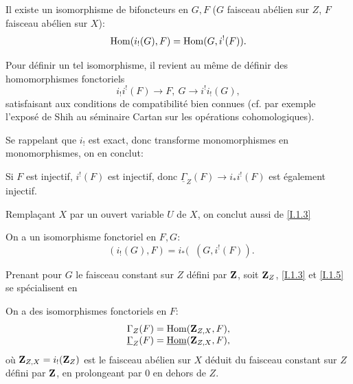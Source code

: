 \begin{proposition} \label{I.1.3} Il existe un isomorphisme de bifoncteurs en $G, F$ ($G$ faisceau ab\'elien sur $Z$, $F$ faisceau ab\'elien sur $X$):
\begin{equation} \label{eq:I.10} {\operatorname{Hom}(i_!(G), F) = \operatorname{Hom}(G, i^!(F))}.
\end{equation}
\end{proposition}

Pour d\'efinir un tel isomorphisme, il revient au m\^eme de d\'efinir des homomorphismes fonctoriels
$$i_!i^!(F) \to F, \ G \to i^!i_!(G),
$$
satisfaisant aux conditions de compatibilit\'e bien connues (cf. par exemple l'expos\'e de Shih au s\'eminaire Cartan sur les op\'erations cohomologiques).

Se rappelant que $i_!$ est exact, donc transforme monomorphismes en monomorphismes, on en conclut:

\begin{corollaire} \label{I.1.4}
Si $F$ est injectif, $i^!(F)$ est injectif, donc $\underline{\Gamma}_Z(F) \to i_*i^!(F)$ est \'egalement injectif.
\end{corollaire}

Rempla\c cant $X$ par un ouvert variable $U$ de $X$, on conclut
aussi de \ref{I.1.3}

\begin{corollaire} \label{I.1.5} On a un isomorphisme fonctoriel en $F, G$:
\begin{equation} \label{eq:I.11}
\mathop{\underline{\mathrm{Hom}}}\nolimits{(i_!(G), F)} =i_*(\mathop{\underline{\mathrm{Hom}}}\nolimits{(G, i^!(F))}.
\end{equation}
\end{corollaire}

Prenant pour $G$ le faisceau constant sur $Z$ d\'efini par $\mathbf{Z}$, soit $\mathbf{Z}_Z$, \ref{I.1.3} et \ref{I.1.5} se sp\'ecialisent en

\begin{corollaire} \label{I.1.6} On a des isomorphismes fonctoriels en $F$:
\begin{equation} \label{eq:I.12}
\begin{array}[c]{l} {\Gamma_Z(F)=\operatorname{Hom}(\mathbf{Z}_{Z, X}, F)}, \\
{\underline{\Gamma}_Z(F)=\mathop{\underline{\mathrm{Hom}}}\nolimits(\mathbf{Z}_{Z, X}, F)},
\end{array}
\end{equation}
o\`u $\mathbf{Z}_{Z, X}= i_!(\mathbf{Z}_Z)$ est le faisceau ab\'elien sur $X$ d\'eduit du faisceau constant sur $Z$ d\'efini par $\mathbf{Z}$, en prolongeant par $0$ en dehors de $Z$.
\end{corollaire}

